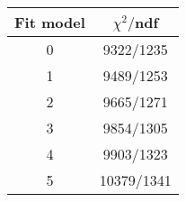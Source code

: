 \begin{tabular}{c|c}
Fit model & $\chi^2/$ndf \\
\hline
0 & 9322/1235\\
1 & 9489/1253\\
2 & 9665/1271\\
3 & 9854/1305\\
4 & 9903/1323\\
5 & 10379/1341\\
\end{tabular}
